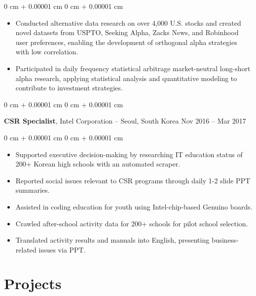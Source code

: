 \documentclass[10pt, letterpaper]{article}
\newenvironment{highlights}{
    \begin{itemize}[
        topsep=0.10 cm,
        parsep=0.10 cm,
        partopsep=0pt,
        itemsep=0pt,
        leftmargin=0 cm + 10pt
    ]
}{
    \end{itemize}
} %
\newenvironment{onecolentry}{
    \begin{adjustwidth}{
        0 cm + 0.00001 cm
    }{
        0 cm + 0.00001 cm
    }
}{
    \end{adjustwidth}
} %
\newenvironment{twocolentry}[2][]{
    \onecolentry
    \def\secondColumn{#2}
    \setcolumnwidth{\fill, 4.5 cm}
    \begin{paracol}{2}
}{
    \switchcolumn \raggedleft \secondColumn
    \end{paracol}
    \endonecolentry
} %
\begin{document}
        \vspace{0.10 cm}
        \begin{onecolentry}
            \begin{highlights}
                \item Conducted alternative data research on over 4,000 U.S. stocks and created novel datasets from USPTO, Seeking Alpha, Zacks News, and Robinhood user preferences, enabling the development of orthogonal alpha strategies with low correlation.
                \item Participated in daily frequency statistical arbitrage market-neutral long-short alpha research, applying statistical analysis and quantitative modeling to contribute to investment strategies.
            \end{highlights}
        \end{onecolentry}


        \vspace{0.2 cm}

        \begin{twocolentry}{
            Nov 2016 – Mar 2017
        }
            \textbf{CSR Specialist}, Intel Corporation -- Seoul, South Korea\end{twocolentry}

        \vspace{0.10 cm}
        \begin{onecolentry}
            \begin{highlights}
                \item Supported executive decision-making by researching IT education status of 200+ Korean high schools with an automated scraper.
                \item Reported social issues relevant to CSR programs through daily 1-2 slide PPT summaries.
                \item Assisted in coding education for youth using Intel-chip-based Genuino boards.
                \item Crawled after-school activity data for 200+ schools for pilot school selection.
                \item Translated activity results and manuals into English, presenting business-related issues via PPT.
            \end{highlights}
        \end{onecolentry}



    
    \section{Projects}
\end{document}
